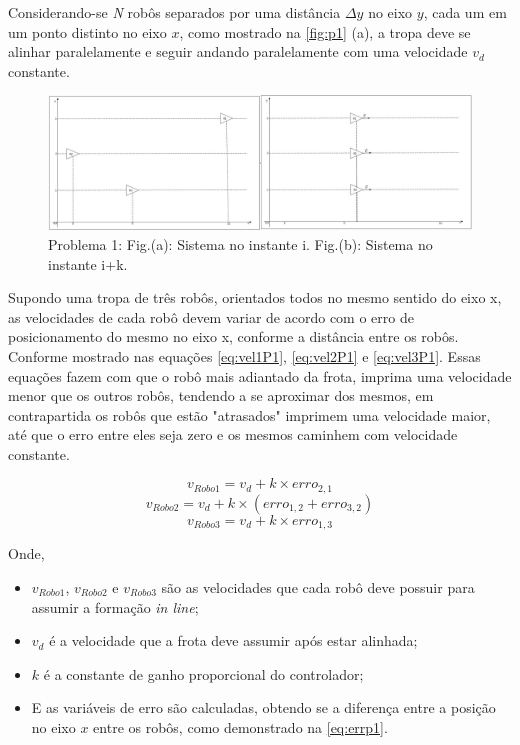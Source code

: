Considerando-se \emph{N} robôs separados por uma distância $\Delta$$y$ no eixo $y$, cada um em um ponto distinto no eixo $x$, como mostrado na \autoref{fig:p1} (a), a tropa deve se alinhar paralelamente e seguir andando paralelamente com uma velocidade $v_{d}$ constante.

\begin{figure}[!htb]
	\centering
	\includegraphics[width=16cm]{./04-figuras/p1}
	\caption{Problema 1: Fig.(a): Sistema no instante i. Fig.(b): Sistema no instante i+k.}
	\label{fig:p1}
\end{figure}

Supondo uma tropa de três robôs, orientados todos no mesmo sentido do eixo x, as velocidades de cada robô devem variar de acordo com o erro de posicionamento do mesmo no eixo x, conforme a distância entre os robôs. Conforme mostrado nas  equações \ref{eq:vel1P1}, \ref{eq:vel2P1} e \ref{eq:vel3P1}. Essas equações fazem com que o robô mais adiantado da frota, imprima uma velocidade menor que os outros robôs, tendendo a se aproximar dos mesmos, em contrapartida os robôs que estão "atrasados" imprimem uma velocidade maior, até que o erro entre eles seja zero e os mesmos caminhem com velocidade constante. 

\begin{equation}
v_{Robo1} = v_{d} + k \times erro_{2,1}
\label{eq:vel1P1}
\end{equation}
\begin{equation}
v_{Robo2} = v_{d} + k\times (erro_{1,2} + erro_{3,2})
\label{eq:vel2P1}
\end{equation}
\begin{equation}
v_{Robo3} = v_{d} + k\times erro_{1,3}
\label{eq:vel3P1}
\end{equation}

Onde,
\begin{itemize}
	\item $v_{Robo1}$, $v_{Robo2}$ e $v_{Robo3}$ são as velocidades que cada robô deve possuir para assumir a formação \emph{in line};
	\item $v_{d}$ é a velocidade que a frota deve assumir após estar alinhada;
	\item $k$ é a constante de ganho proporcional do controlador;
	\item E as variáveis de erro são calculadas, obtendo se a diferença entre a posição no eixo $x$ entre os robôs, como demonstrado na \autoref{eq:errp1}.	
\end{itemize}

